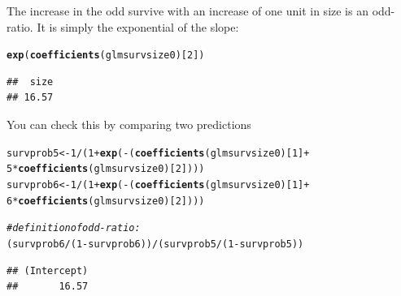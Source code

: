 \documentclass[12pt,a4paper]{scrartcl}\usepackage[]{graphicx}\usepackage[]{color}
\makeatletter
\newcommand{\hlnum}[1]{\textcolor[rgb]{0.686,0.059,0.569}{#1}}%
\newcommand{\hlcom}[1]{\textcolor[rgb]{0.678,0.584,0.686}{\textit{#1}}}%
\newcommand{\hlopt}[1]{\textcolor[rgb]{0,0,0}{#1}}%
\newcommand{\hlstd}[1]{\textcolor[rgb]{0.345,0.345,0.345}{#1}}%
\newcommand{\hlkwb}[1]{\textcolor[rgb]{0.69,0.353,0.396}{#1}}%
\newcommand{\hlkwd}[1]{\textcolor[rgb]{0.737,0.353,0.396}{\textbf{#1}}}%
\newenvironment{kframe}{%
 \def\at@end@of@kframe{}%
 \ifinner\ifhmode%
  \def\at@end@of@kframe{\end{minipage}}%
  \begin{minipage}{\columnwidth}%
 \fi\fi%
 \def\FrameCommand##1{\hskip\@totalleftmargin \hskip-\fboxsep
 \colorbox{shadecolor}{##1}\hskip-\fboxsep
     \hskip-\linewidth \hskip-\@totalleftmargin \hskip\columnwidth}%
 \MakeFramed {\advance\hsize-\width
   \@totalleftmargin\z@ \linewidth\hsize
   \@setminipage}}%
 {\par\unskip\endMakeFramed%
 \at@end@of@kframe}
\newenvironment{knitrout}{}{} %
\makeatother
\begin{document}
\begin{Answer}
The increase in the odd survive with an increase of one unit in size is an odd-ratio. It is simply the exponential of the slope:
\begin{knitrout}
\color{fgcolor}\begin{kframe}
\begin{alltt}
\hlkwd{exp}\hlstd{(}\hlkwd{coefficients}\hlstd{(glmsurvsize0)[}\hlnum{2}\hlstd{])}
\end{alltt}
\begin{verbatim}
##  size 
## 16.57
\end{verbatim}
\end{kframe}
\end{knitrout}

You can check this by comparing two predictions
\begin{knitrout}
\color{fgcolor}\begin{kframe}
\begin{alltt}
\hlstd{survprob5} \hlkwb{<-} \hlnum{1}\hlopt{/}\hlstd{(}\hlnum{1}\hlopt{+}\hlkwd{exp}\hlstd{(}\hlopt{-}\hlstd{(}\hlkwd{coefficients}\hlstd{(glmsurvsize0)[}\hlnum{1}\hlstd{]}\hlopt{+}
                          \hlnum{5}\hlopt{*}\hlkwd{coefficients}\hlstd{(glmsurvsize0)[}\hlnum{2}\hlstd{])))}
\hlstd{survprob6} \hlkwb{<-} \hlnum{1}\hlopt{/}\hlstd{(}\hlnum{1}\hlopt{+}\hlkwd{exp}\hlstd{(}\hlopt{-}\hlstd{(}\hlkwd{coefficients}\hlstd{(glmsurvsize0)[}\hlnum{1}\hlstd{]}\hlopt{+}
                          \hlnum{6}\hlopt{*}\hlkwd{coefficients}\hlstd{(glmsurvsize0)[}\hlnum{2}\hlstd{])))}

\hlcom{#definition of odd-ratio:}
\hlstd{(survprob6}\hlopt{/}\hlstd{(}\hlnum{1}\hlopt{-}\hlstd{survprob6))}\hlopt{/}\hlstd{(survprob5}\hlopt{/}\hlstd{(}\hlnum{1}\hlopt{-}\hlstd{survprob5))}
\end{alltt}
\begin{verbatim}
## (Intercept) 
##       16.57
\end{verbatim}
\end{kframe}
\end{knitrout}

\end{Answer}
\end{document}
